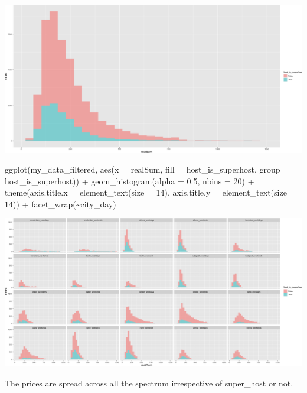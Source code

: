 \documentclass[
]{article}
\newenvironment{Shaded}{\begin{snugshade}}{\end{snugshade}}
\newcommand{\AttributeTok}[1]{\textcolor[rgb]{0.77,0.63,0.00}{#1}}
\newcommand{\DecValTok}[1]{\textcolor[rgb]{0.00,0.00,0.81}{#1}}
\newcommand{\FloatTok}[1]{\textcolor[rgb]{0.00,0.00,0.81}{#1}}
\newcommand{\FunctionTok}[1]{\textcolor[rgb]{0.00,0.00,0.00}{#1}}
\newcommand{\NormalTok}[1]{#1}
\newcommand{\SpecialCharTok}[1]{\textcolor[rgb]{0.00,0.00,0.00}{#1}}
\begin{document}
\includegraphics{Project_files/figure-latex/unnamed-chunk-20-2.png}

\begin{Shaded}
\begin{Highlighting}[]
\FunctionTok{ggplot}\NormalTok{(my\_data\_filtered, }\FunctionTok{aes}\NormalTok{(}\AttributeTok{x =}\NormalTok{ realSum, }\AttributeTok{fill =}\NormalTok{ host\_is\_superhost,}
    \AttributeTok{group =}\NormalTok{ host\_is\_superhost)) }\SpecialCharTok{+} \FunctionTok{geom\_histogram}\NormalTok{(}\AttributeTok{alpha =} \FloatTok{0.5}\NormalTok{,}
    \AttributeTok{nbins =} \DecValTok{20}\NormalTok{) }\SpecialCharTok{+} \FunctionTok{theme}\NormalTok{(}\AttributeTok{axis.title.x =} \FunctionTok{element\_text}\NormalTok{(}\AttributeTok{size =} \DecValTok{14}\NormalTok{),}
    \AttributeTok{axis.title.y =} \FunctionTok{element\_text}\NormalTok{(}\AttributeTok{size =} \DecValTok{14}\NormalTok{)) }\SpecialCharTok{+} \FunctionTok{facet\_wrap}\NormalTok{(}\SpecialCharTok{\textasciitilde{}}\NormalTok{city\_day)}
\end{Highlighting}
\end{Shaded}

\includegraphics{Project_files/figure-latex/unnamed-chunk-20-3.png}

The prices are spread across all the spectrum irrespective of
super\_host or not.
\end{document}
